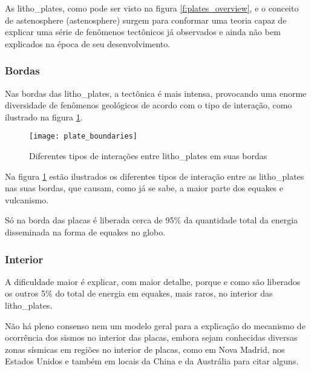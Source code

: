 As \glspl{litho_plate}, como pode ser visto na figura \ref{f:plates_overview},
e o conceito de \gls{astenosphere} (\glsdesc{astenosphere}) 
surgem para conformar uma teoria capaz de explicar
uma série de fenômenos tectônicos já observados e ainda não bem explicados na época
de seu desenvolvimento. 


\subsubsection{Bordas}
\label{sec:02_bordas}

Nas bordas das \glspl{litho_plate}, a tectônica é mais intensa, 
provocando uma enorme diversidade de fenômenos geológicos de acordo
com o tipo de interação, como ilustrado na figura \ref{f:plate_boundaries}.

\begin{figure}[H]
   \centering
   \texttt{[image: plate\_boundaries]}
   \caption[Diferentes tipos de interações entre \glspl{litho_plate} em suas bordas]
   		   {Diferentes tipos de interações entre \glspl{litho_plate} em suas bordas\footnotemark} 
   \label{f:plate_boundaries}
\end{figure} 
 
Na figura \ref{f:plate_boundaries} estão ilustrados os diferentes tipos de interação 
entre as \glspl{litho_plate} nas suas bordas, que causam, como já se sabe, a maior
parte dos \glspl{equake} e vulcanismo.

Só na borda das placas é liberada cerca de 95\% da quantidade total da energia 
disseminada na forma de \glspl{equake} no globo.

\subsubsection{Interior}
\label{sec:02_interior}

A dificuldade maior é explicar, com maior detalhe, porque e como são liberados os outros 
5\% do total de energia em \glspl{equake}, mais raros, no interior das \glspl{litho_plate}.

Não há pleno consenso nem um modelo geral para a explicação do mecanismo de ocorrência dos
sismos no interior das placas, embora sejam conhecidas diversas zonas sísmicas em regiões no interior
de placas, como em Nova Madrid, nos Estados Unidos e também em locais da China e da Austrália para citar alguns.


